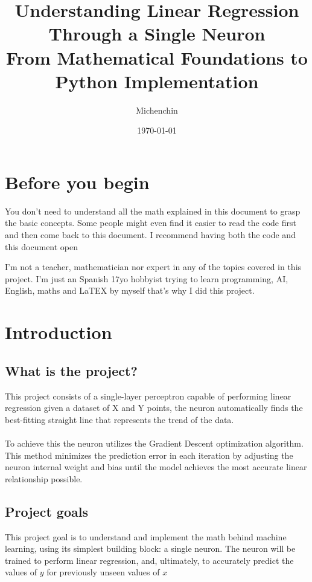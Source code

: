 \documentclass[12pt,a4paper]{article}
\title{
	Understanding Linear Regression Through a Single Neuron\\
	{\large From Mathematical Foundations to Python Implementation}
}
\author{Michenchin}
\date{\today}
\begin{document}
	\maketitle
	\newpage
	\tableofcontents
	\newpage
	
	\section{Before you begin}
		\begin{NOTE}
			You don't need to understand all the math explained in this document to grasp the basic concepts. Some people might even find it easier to read the code first and then come back to this document. I recommend having both the code and this document open
		\end{NOTE}
		\begin{WARNING}
			I'm not a teacher, mathematician nor expert in any of the topics covered in this project. I'm just an Spanish 17yo hobbyist trying to learn programming, AI, English, maths and LaTEX by myself that's why I did this project.
		\end{WARNING}
	\section{Introduction}
		\subsection{What is the project?}
			This project consists of a single-layer perceptron capable of performing linear regression given a dataset of X and Y points, the neuron automatically finds the best-fitting straight line that represents the trend of the data.\\
			\\
			To achieve this the neuron utilizes the Gradient Descent optimization algorithm. This method minimizes the prediction error in each iteration by adjusting the neuron internal weight and bias until the model achieves the most accurate linear relationship possible.\\
		\subsection{Project goals}
			This project goal is to understand and implement the math behind machine learning, using its simplest building block: a single neuron.
			The neuron will be trained to perform linear regression, and, ultimately, to accurately predict the values of $y$ for previously unseen values of $x$
\end{document}
